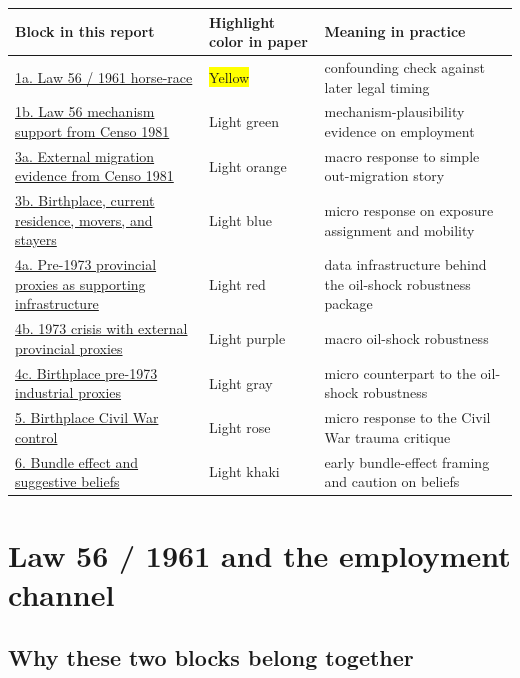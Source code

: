 \documentclass[11pt]{article}
\begin{document}
\begin{longtable}{p{} p{} p{}}
\toprule
Block in this report & Highlight color in paper & Meaning in practice \\
\midrule
\hyperref[sec:law56-1a]{1a. Law 56 / 1961 horse-race} & \colorbox{yellow}{Yellow} & confounding check against later legal timing \\
\hyperref[sec:law56-1b]{1b. Law 56 mechanism support from Censo 1981} & \colorbox{green!25}{Light green} & mechanism-plausibility evidence on employment \\
\hyperref[sec:migration-3a]{3a. External migration evidence from Censo 1981} & \colorbox{orange!25}{Light orange} & macro response to simple out-migration story \\
\hyperref[sec:migration-3b]{3b. Birthplace, current residence, movers, and stayers} & \colorbox{cyan!20}{Light blue} & micro response on exposure assignment and mobility \\
\hyperref[sec:oilshock-4a]{4a. Pre-1973 provincial proxies as supporting infrastructure} & \colorbox{red!18}{Light red} & data infrastructure behind the oil-shock robustness package \\
\hyperref[sec:oilshock-4b]{4b. 1973 crisis with external provincial proxies} & \colorbox{violet!22}{Light purple} & macro oil-shock robustness \\
\hyperref[sec:oilshock-4c]{4c. Birthplace pre-1973 industrial proxies} & \colorbox{black!10}{Light gray} & micro counterpart to the oil-shock robustness \\
\hyperref[sec:warbirth]{5. Birthplace Civil War control} & \colorbox{pink!25}{Light rose} & micro response to the Civil War trauma critique \\
\hyperref[sec:beliefs]{6. Bundle effect and suggestive beliefs} & \colorbox{yellow!35}{Light khaki} & early bundle-effect framing and caution on beliefs \\
\bottomrule
\end{longtable}

\section{Law 56 / 1961 and the employment channel}\label{sec:law56}

\subsection*{Why these two blocks belong together}
\end{document}
